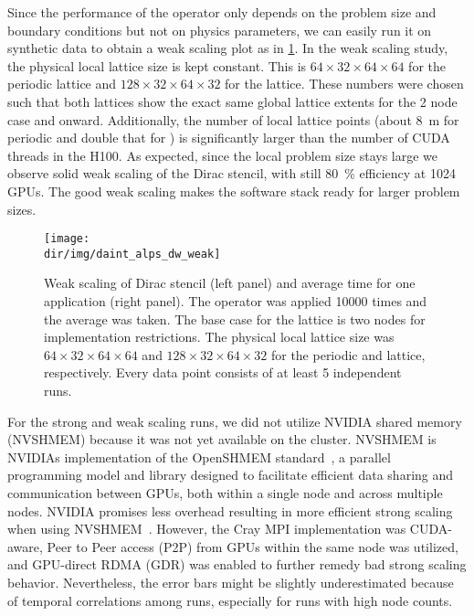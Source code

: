 Since the performance of the operator only depends on the problem size and boundary conditions but not on physics parameters, we can easily run it on synthetic data to obtain a weak scaling plot as in \cref{fig:daint:alps:dw:weak}.
In the weak scaling study, the physical local lattice size is kept constant.
This is $64 \times 32 \times 64 \times 64$ for the periodic lattice and $128 \times 32 \times 64 \times 32$ for the \Cstar lattice.
These numbers were chosen such that both lattices show the exact same global lattice extents for the \num{2} node case and onward.
Additionally, the number of local lattice points (about \SI{8}{m} for periodic and double that for \Cstar) is significantly larger than the number of CUDA threads in the H100.
As expected, since the local problem size stays large we observe solid weak scaling of the Dirac stencil, with still \SI{80}{\percent} efficiency at \num{1024} GPUs.
The good weak scaling makes the software stack ready for larger problem sizes.
\begin{figure}
    \centering
    \texttt{[image: \\dir/img/daint\_alps\_dw\_weak]}
    \caption{Weak scaling of Dirac stencil (left panel) and average time for one application (right panel). The operator was applied \num{10000} times and the average was taken. The base case for the \Cstar lattice is two nodes for implementation restrictions. The physical local lattice size was $64 \times 32 \times 64 \times 64$ and $128 \times 32 \times 64 \times 32$ for the periodic and \Cstar lattice, respectively. Every data point consists of at least \num{5} independent runs. }
    \label{fig:daint:alps:dw:weak}
\end{figure}

For the strong and weak scaling runs, we did not utilize NVIDIA shared memory (NVSHMEM) because it was not yet available on the cluster.
NVSHMEM is NVIDIAs implementation of the OpenSHMEM standard~\cite{online:openshmem}, a parallel programming model and library designed to facilitate efficient data sharing and communication between GPUs, both within a single node and across multiple nodes.
NVIDIA promises less overhead resulting in more efficient strong scaling when using NVSHMEM~\cite{online:nvshmem}.
However, the Cray MPI implementation was CUDA-aware, Peer to Peer access (P2P) from GPUs within the same node was utilized, and GPU-direct RDMA (GDR) was enabled to further remedy bad strong scaling behavior.
Nevertheless, the error bars might be slightly underestimated because of temporal correlations among runs, especially for runs with high node counts.

